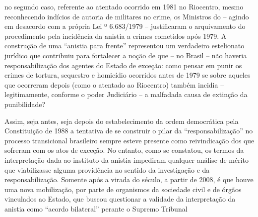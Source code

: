 no segundo caso, referente ao atentado ocorrido em 1981 no Riocentro,
mesmo reconhecendo indícios de autoria de militares no crime, os
Ministros do  -- agindo em desacordo com a própria Lei º 6.683/1979
-- justificaram o arquivamento do procedimento pela incidência da
anistia a crimes cometidos após 1979. A construção de uma ``anistia para
frente'' representou um verdadeiro estelionato jurídico que contribuiu
para fortalecer a noção de que -- no Brasil -- não haveria
responsabilização dos agentes do Estado de exceção: como pensar em punir
os crimes de tortura, sequestro e homicídio ocorridos antes de 1979 se
sobre aqueles que ocorreram depois (como o atentado ao Riocentro) também
incidia -- legitimamente, conforme o poder Judiciário -- a malfadada
causa de extinção da punibilidade?

Assim, seja antes, seja depois do estabelecimento da ordem democrática
pela Constituição de 1988 a tentativa de se construir o pilar da
``responsabilização'' no processo transicional brasileiro sempre esteve
presente como reivindicação dos que sofreram com os atos de exceção. No
entanto, como se constatou, os termos da interpretação dada ao instituto
da anistia impediram qualquer análise de mérito que viabilizasse alguma
providência no sentido da investigação e da responsabilização. Somente
após a virada do século, a partir de 2008, é que houve uma nova
mobilização, por parte de organismos da sociedade civil e de órgãos
vinculados ao Estado, que buscou questionar a validade da interpretação
da anistia como ``acordo bilateral'' perante o Supremo Tribunal
